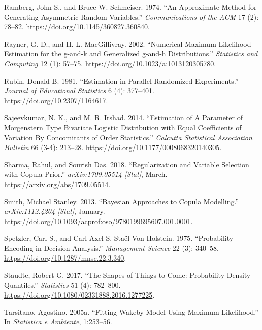 \documentclass[
]{interact}
\newlength{\cslhangindent}
\newenvironment{CSLReferences}[2] %
 {\begin{list}{}{%
  \setlength{\itemindent}{0pt}
  \setlength{\leftmargin}{0pt}
  \setlength{\parsep}{0pt}
  \ifodd #1
   \setlength{\leftmargin}{\cslhangindent}
   \setlength{\itemindent}{-1\cslhangindent}
  \fi
  \setlength{\itemsep}{#2\baselineskip}}}
 {\end{list}}
\begin{document}
\begin{CSLReferences}{1}{0}
Ramberg, John S., and Bruce W. Schmeiser. 1974. {``An Approximate Method
for Generating Asymmetric Random Variables.''} \emph{Communications of
the ACM} 17 (2): 78--82. \url{https://doi.org/10.1145/360827.360840}.

Rayner, G. D., and H. L. MacGillivray. 2002. {``Numerical Maximum
Likelihood Estimation for the g-and-k and Generalized g-and-h
Distributions.''} \emph{Statistics and Computing} 12 (1): 57--75.
\url{https://doi.org/10.1023/a:1013120305780}.

Rubin, Donald B. 1981. {``Estimation in {Parallel Randomized
Experiments}.''} \emph{Journal of Educational Statistics} 6 (4):
377--401. \url{https://doi.org/10.2307/1164617}.

Sajeevkumar, N. K., and M. R. Irshad. 2014. {``Estimation of {A
Parameter} of {Morgenstern Type Bivariate Logistic Distribution} with
{Equal Coefficients} of {Variation By Concomitants} of {Order
Statistics}.''} \emph{Calcutta Statistical Association Bulletin} 66
(3-4): 213--28. \url{https://doi.org/10.1177/0008068320140305}.

Sharma, Rahul, and Sourish Das. 2018. {``Regularization and {Variable
Selection} with {Copula Prior}.''} \emph{arXiv:1709.05514 {[}Stat{]}},
March. \url{https://arxiv.org/abs/1709.05514}.

Smith, Michael Stanley. 2013. {``Bayesian {Approaches} to {Copula
Modelling}.''} \emph{arXiv:1112.4204 {[}Stat{]}}, January.
\url{https://doi.org/10.1093/acprof:oso/9780199695607.001.0001}.

Spetzler, Carl S., and Carl-Axel S. Staël Von Holstein. 1975.
{``Probability {Encoding} in {Decision Analysis}.''} \emph{Management
Science} 22 (3): 340--58. \url{https://doi.org/10.1287/mnsc.22.3.340}.

Staudte, Robert G. 2017. {``The {Shapes} of {Things} to {Come}:
{Probability Density Quantiles}.''} \emph{Statistics} 51 (4): 782--800.
\url{https://doi.org/10.1080/02331888.2016.1277225}.

Tarsitano, Agostino. 2005a. {``Fitting {Wakeby} Model Using Maximum
Likelihood.''} In \emph{Statistica e {Ambiente}}, 1:253--56.


\end{CSLReferences}
\end{document}

